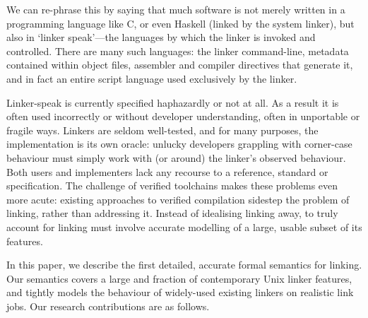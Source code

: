 We can re-phrase this by saying that much software is not merely written in a programming language like C, or even Haskell (linked by the system linker), but also in `linker speak'---the languages by which the linker is invoked and controlled.
There are many such languages: the linker command-line, metadata contained within object files, assembler and compiler directives that generate it, and in fact an entire script language used exclusively by the linker.

Linker-speak is currently specified haphazardly or not at all.
As a result it is often used incorrectly or without developer understanding, often in unportable or fragile ways.
Linkers are seldom well-tested, and for many purposes, the implementation is its own oracle: unlucky developers grappling with corner-case behaviour must simply work with (or around) the linker's observed behaviour.
Both users and implementers lack any recourse to a reference, standard or specification. 
The challenge of verified toolchains makes these problems even more acute: existing
approaches to verified compilation sidestep the problem of linking, rather than addressing it.
Instead of idealising linking away, to truly account for linking must involve accurate modelling of a large, usable subset of its features.

In this paper, we describe the first detailed, accurate formal semantics for linking. 
Our semantics covers a large and fraction of contemporary Unix linker features, and tightly models the behaviour of widely-used existing linkers on realistic link jobs.
Our research contributions are as follows.

